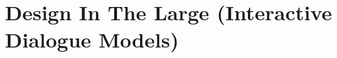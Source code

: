 \documentclass[../DD.tex]{subfiles}
\begin{document}
\chapter{Design In The Large (Interactive Dialogue Models)}
\thispagestyle{fancy}
	
\end{document}
